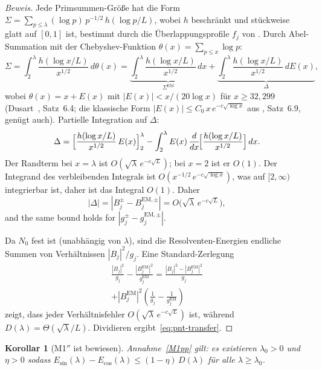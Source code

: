 \documentclass[12pt,a4paper]{article}
\newtheorem{corollary}[theorem]{Korollar}
\theoremstyle{definition}
\theoremstyle{remark}
\begin{document}
\begin{proof}[Beweis]
Jede Primsummen-Größe hat die Form $\Sigma = \sum_{p \leq \lambda} (\log p)\,p^{-1/2}\,h(\log p/L)$, wobei $h$ beschränkt und stückweise glatt auf $[0,1]$ ist, bestimmt durch die Überlappungsprofile $f_j$ von . Durch Abel-Summation mit der Chebyshev-Funktion $\theta(x) = \sum_{p \leq x} \log p$:
\[
  \Sigma = \int_2^{\lambda} \frac{h(\log x/L)}{x^{1/2}}\,d\theta(x)
  = \underbrace{\int_2^{\lambda} \frac{h(\log x/L)}{x^{1/2}}\,dx}_{\Sigma^{\mathrm{EM}}}
  + \underbrace{\int_2^{\lambda} \frac{h(\log x/L)}{x^{1/2}}\,dE(x)}_{\Delta},
\]
wobei $\theta(x) = x + E(x)$ mit $|E(x)| < x/(20\log x)$ für $x \geq 32{,}299$ (Dusart~\cite{Dusart2010}, Satz~6.4; die klassische Form $|E(x)| \leq C_0\,x\,e^{-c\sqrt{\log x}}$ aus \cite{IwaniecKowalski2004}, Satz~6.9, genügt auch). Partielle Integration auf $\Delta$:
\[
  \Delta = \Bigl[\frac{h(\log x/L)}{x^{1/2}}\,E(x)\Bigr]_2^{\lambda}
  - \int_2^{\lambda} E(x)\,\frac{d}{dx}\!\Bigl[\frac{h(\log x/L)}{x^{1/2}}\Bigr]\,dx.
\]
Der Randterm bei $x = \lambda$ ist $O(\sqrt{\lambda}\,e^{-c\sqrt{L}})$; bei $x = 2$ ist er $O(1)$. Der Integrand des verbleibenden Integrals ist $O(x^{-1/2}\,e^{-c\sqrt{\log x}})$, was auf $[2,\infty)$ integrierbar ist, daher ist das Integral $O(1)$. Daher
\begin{equation}
\label{eq:pnt-error}
  |\Delta| = |B_j^{\pm} - B_j^{\mathrm{EM},\pm}| = O\!\bigl(\sqrt{\lambda}\,e^{-c\sqrt{L}}\bigr),
\end{equation}
and the same bound holds for $|g_j^{\pm} - g_j^{\mathrm{EM},\pm}|$.

Da $N_0$ fest ist (unabhängig von $\lambda$), sind die Resolventen-Energien endliche Summen von Verhältnissen $|B_j|^2/g_j$. Eine Standard-Zerlegung
\begin{multline*}
  \frac{|B_j|^2}{g_j} - \frac{|B_j^{\mathrm{EM}}|^2}{g_j^{\mathrm{EM}}}
  = \frac{|B_j|^2 - |B_j^{\mathrm{EM}}|^2}{g_j} \\
  + |B_j^{\mathrm{EM}}|^2\!\left(\frac{1}{g_j} - \frac{1}{g_j^{\mathrm{EM}}}\right)
\end{multline*}
zeigt, dass jeder Verhältnisfehler $O(\sqrt{\lambda}\,e^{-c\sqrt{L}})$ ist, während $D(\lambda) = \Theta(\sqrt{\lambda}/L)$. Dividieren ergibt~\eqref{eq:pnt-transfer}.
\end{proof}

\begin{corollary}[M1$''$ ist bewiesen]
\label{cor:M1-proved}
Annahme~\ref{M1pp} gilt: es existieren $\lambda_0 > 0$ und $\eta > 0$ sodass $E_{\sin}(\lambda) - E_{\cos}(\lambda) \leq (1-\eta)\,D(\lambda)$ für alle $\lambda \geq \lambda_0$.
\end{corollary}
\end{document}
